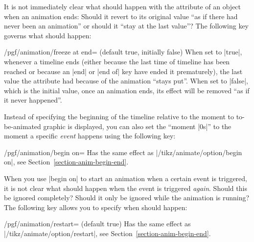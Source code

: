 It is not immediately clear what should happen with the attribute of an object
when an animation ends: Should it revert to its original value ``as if there
had never been an animation'' or should it ``stay at the last value''? The
following key governs what should happen:

\begin{key}{/pgf/animation/freeze at end= (default true, initially false)}
    When set to |true|, whenever a timeline ends (either because the last time
    of timeline has been reached or because an |end| or |end of| key have ended
    it prematurely), the last value the attribute had because of the animation
    ``stays put''. When set to |false|, which is the initial value, once an
    animation ends, its effect will be removed ``as if it never happened''.
\begin{codeexample}[animation list={0,1,2,3,4}]
\end{codeexample}
\begin{codeexample}[animation list={0,1,2,3,4}]
\end{codeexample}
\end{key}

Instead of specifying the beginning of the timeline relative to the moment to
to-be-animated graphic is displayed, you can also set the ``moment |0s|'' to
the moment a specific \emph{event} happens using the following key:

\begin{key}{/pgf/animation/begin on=}
    Has the same effect as |/tikz/animate/option/begin on|, see
    Section~\ref{section-anim-begin-end}.
\end{key}

When you use |begin on| to start an animation when a certain event is
triggered, it is not clear what should happen when the event is triggered
\emph{again}. Should this be ignored completely? Should it only be ignored
while the animation is running? The following key allows you to specify when
should happen:

\begin{key}{/pgf/animation/restart= (default true)}
    Has the same effect as |/tikz/animate/option/restart|, see
    Section~\ref{section-anim-begin-end}.
\end{key}

